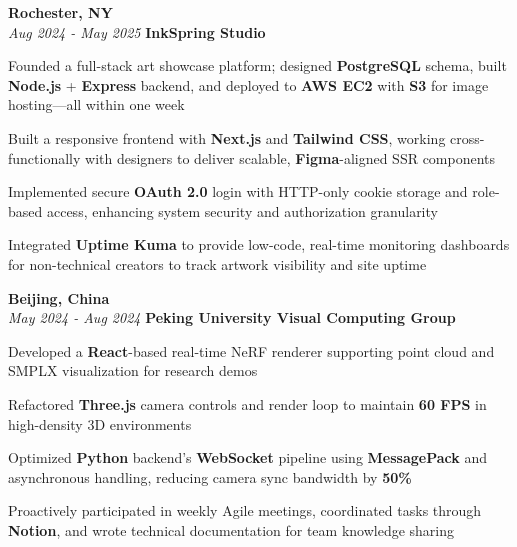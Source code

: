 \begin{twocolentry}{
    \textbf{Rochester, NY} \\
    \textit{Aug 2024 - May 2025}
}{
    \textbf{InkSpring Studio} \\
}
\end{twocolentry}
\begin{onecolentry}
    \begin{highlights}
        \item Founded a full-stack art showcase platform; designed \textbf{PostgreSQL} schema, built \textbf{Node.js} + \textbf{Express} backend, and deployed to \textbf{AWS EC2} with \textbf{S3} for image hosting—all within one week
        \item Built a responsive frontend with \textbf{Next.js} and \textbf{Tailwind CSS}, working cross-functionally with designers to deliver scalable, \textbf{Figma}-aligned SSR components
        \item Implemented secure \textbf{OAuth 2.0} login with HTTP-only cookie storage and role-based access, enhancing system security and authorization granularity
        \item Integrated \textbf{Uptime Kuma} to provide low-code, real-time monitoring dashboards for non-technical creators to track artwork visibility and site uptime
    \end{highlights}
\end{onecolentry}

\vspace{0.2cm}

\begin{twocolentry}{
    \textbf{Beijing, China} \\
    \textit{May 2024 - Aug 2024}
}{
    \textbf{Peking University Visual Computing Group} \\
}
\end{twocolentry}
\begin{onecolentry}
    \begin{highlights}
        \item Developed a \textbf{React}-based real-time NeRF renderer supporting point cloud and SMPLX visualization for research demos
        \item Refactored \textbf{Three.js} camera controls and render loop to maintain \textbf{60 FPS} in high-density 3D environments
        \item Optimized \textbf{Python} backend's \textbf{WebSocket} pipeline using \textbf{MessagePack} and asynchronous handling, reducing camera sync bandwidth by \textbf{50\%}
        \item Proactively participated in weekly Agile meetings, coordinated tasks through \textbf{Notion}, and wrote technical documentation for team knowledge sharing
    \end{highlights}
\end{onecolentry}
